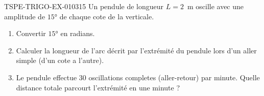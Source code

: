 \begin{exercice}{TSPE-TRIGO-EX-010}{3}{15}
Un pendule de longueur $L = 2$~m oscille avec une amplitude de $15°$ de chaque cote de la verticale.
\begin{enumerate}
  \item Convertir $15°$ en radians.
  \item Calculer la longueur de l'arc décrit par l'extrémité du pendule lors d'un aller simple (d'un cote a l'autre).
  \item Le pendule effectue $30$ oscillations completes (aller-retour) par minute. Quelle distance totale parcourt l'extrémité en une minute ?
\end{enumerate}
\end{exercice}
